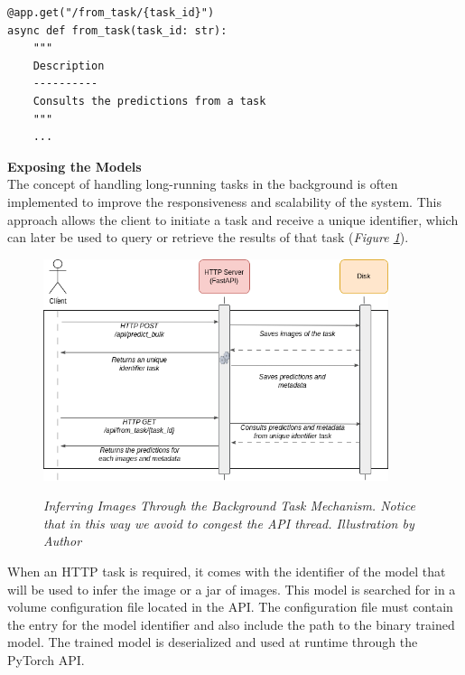 \begin{Verbatim}[fontsize=\small]
@app.get("/from_task/{task_id}")
async def from_task(task_id: str):
    """
    Description
    ----------
    Consults the predictions from a task
    """
    ...
\end{Verbatim}

\newpage

\vspace{0.5cm}
\textbf{Exposing the Models} \\

The concept of handling long-running tasks in the background is often implemented to improve the responsiveness and scalability of the system. This approach allows the client to initiate a task and receive a unique identifier, which can later be used to query or retrieve the results of that task (\textit{Figure \ref{fig:backgrond-task}}). \\


\begin{figure}[H]
\centering
\includegraphics[width=0.9\textwidth]{imatges/preliminaries/BackgroundTask.drawio.png}
\caption[Inferring Images Through the Background Task Mechanism]{\textit{Inferring Images Through the Background Task Mechanism. Notice that in this way we avoid to congest the API thread. Illustration by Author}}
{\label{fig:backgrond-task}}
\end{figure}

When an HTTP task is required, it comes with the identifier of the model that will be used to infer the image or a jar of images. This model is searched for in a volume configuration file located in the API. The configuration file must contain the entry for the model identifier and also include the path to the binary trained model. The trained model is deserialized and used at runtime through the PyTorch API. \\

